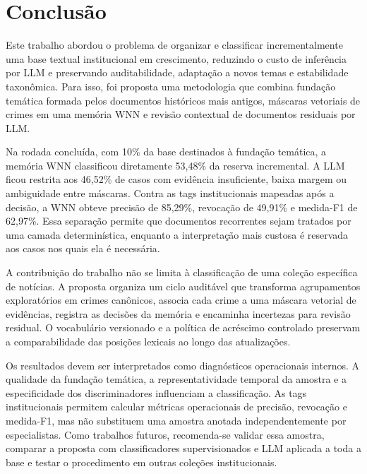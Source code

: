 \section{Conclusão}

Este trabalho abordou o problema de organizar e classificar incrementalmente uma base textual institucional em crescimento, reduzindo o custo de inferência por LLM e preservando auditabilidade, adaptação a novos temas e estabilidade taxonômica. Para isso, foi proposta uma metodologia que combina fundação temática formada pelos documentos históricos mais antigos, máscaras vetoriais de crimes em uma memória WNN e revisão contextual de documentos residuais por LLM.

Na rodada concluída, com 10\% da base destinados à fundação temática, a memória WNN classificou diretamente 53,48\% da reserva incremental. A LLM ficou restrita aos 46,52\% de casos com evidência insuficiente, baixa margem ou ambiguidade entre máscaras. Contra as tags institucionais mapeadas após a decisão, a WNN obteve precisão de 85,29\%, revocação de 49,91\% e medida-F1 de 62,97\%. Essa separação permite que documentos recorrentes sejam tratados por uma camada determinística, enquanto a interpretação mais custosa é reservada aos casos nos quais ela é necessária.

A contribuição do trabalho não se limita à classificação de uma coleção específica de notícias. A proposta organiza um ciclo auditável que transforma agrupamentos exploratórios em crimes canônicos, associa cada crime a uma máscara vetorial de evidências, registra as decisões da memória e encaminha incertezas para revisão residual. O vocabulário versionado e a política de acréscimo controlado preservam a comparabilidade das posições lexicais ao longo das atualizações.

Os resultados devem ser interpretados como diagnósticos operacionais internos. A qualidade da fundação temática, a representatividade temporal da amostra e a especificidade dos discriminadores influenciam a classificação. As tags institucionais permitem calcular métricas operacionais de precisão, revocação e medida-F1, mas não substituem uma amostra anotada independentemente por especialistas. Como trabalhos futuros, recomenda-se validar essa amostra, comparar a proposta com classificadores supervisionados e LLM aplicada a toda a base e testar o procedimento em outras coleções institucionais.
